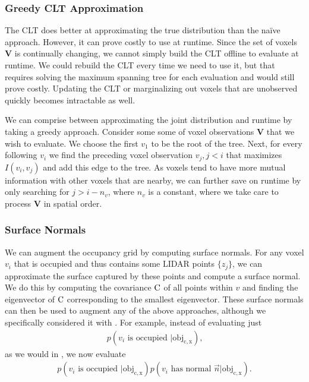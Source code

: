 \subsubsection{Greedy CLT Approximation} \label{sec:greedy_clt}

The \ac{CLT} does better at approximating the true distribution than the na\"ive
approach. However, it can prove costly to use at runtime. Since the set of
voxels $\mathbf{V}$ is continually changing, we cannot simply build the \ac{CLT}
offline to evaluate at runtime. We could rebuild the \ac{CLT} every time we need
to use it, but that requires solving the maximum spanning tree for each
evaluation and would still prove costly. Updating the \ac{CLT} or marginalizing
out voxels that are unobserved quickly becomes intractable as well.

We can comprise between approximating the joint distribution and runtime by
taking a greedy approach. Consider some some of voxel observations $\mathbf{V}$
that we wish to evaluate. We choose the first $v_1$ to be the root of the tree.
Next, for every following $v_i$ we find the preceding voxel observation $v_j, j
< i$ that maximizes $I(v_i, v_j)$ and add this edge to the tree. As voxels tend
to have more mutual information with other voxels that are nearby, we can
further save on runtime by only searching for $j > i - n_v$, where $n_v$ is a
constant, where we take care to process $\mathbf{V}$ in spatial order.

\subsubsection{Surface Normals} \label{sec:normals}

We can augment the occupancy grid by computing surface normals. For any voxel
$v_i$ that is occupied and thus contains some \ac{LIDAR} points $\{z_j\}$, we
can approximate the surface captured by these points and compute a surface
normal. We do this by computing the covariance $\mathrm{C}$ of all points within
$v$ and finding the eigenvector of $\mathrm{C}$ corresponding to the smallest
eigenvector. These surface normals can then be used to augment
any of the above approaches, although we specifically considered it with
. For example, instead of evaluating just
%
\begin{align}
  p(v_i \text{ is occupied } | \mathrm{obj_{c,x}}) \text{,}
\end{align}
%
as we would in , we now evaluate
%
\begin{align}
  p(v_i \text{ is occupied } | \mathrm{obj_{c,x}}) p(v_i \text{ has normal } \vec{n}
  | \mathrm{obj_{c, x}}) \text{.}
\end{align}


